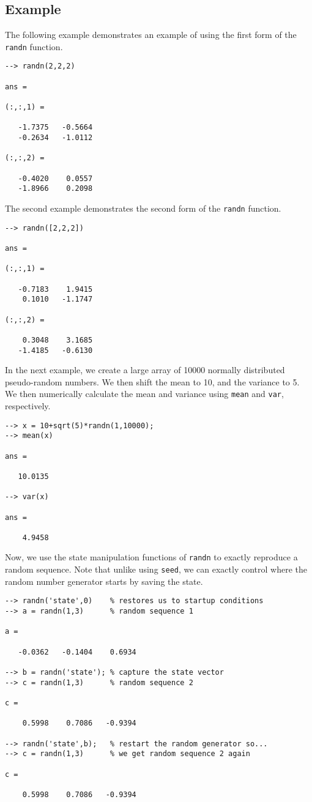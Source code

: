 \subsection{Example}

The following example demonstrates an example of using the first form of the \verb|randn| function.
\begin{verbatim}
--> randn(2,2,2)

ans = 

(:,:,1) = 

   -1.7375   -0.5664 
   -0.2634   -1.0112 

(:,:,2) = 

   -0.4020    0.0557 
   -1.8966    0.2098 
\end{verbatim}
The second example demonstrates the second form of the \verb|randn| function.
\begin{verbatim}
--> randn([2,2,2])

ans = 

(:,:,1) = 

   -0.7183    1.9415 
    0.1010   -1.1747 

(:,:,2) = 

    0.3048    3.1685 
   -1.4185   -0.6130 
\end{verbatim}
In the next example, we create a large array of 10000  normally distributed pseudo-random numbers.  We then shift the mean to 10, and the variance to 5.  We then numerically calculate the mean and variance using \verb|mean| and \verb|var|, respectively.
\begin{verbatim}
--> x = 10+sqrt(5)*randn(1,10000);
--> mean(x)

ans = 

   10.0135 

--> var(x)

ans = 

    4.9458 
\end{verbatim}
Now, we use the state manipulation functions of \verb|randn| to exactly reproduce 
a random sequence.  Note that unlike using \verb|seed|, we can exactly control where
the random number generator starts by saving the state.
\begin{verbatim}
--> randn('state',0)    % restores us to startup conditions
--> a = randn(1,3)      % random sequence 1

a = 

   -0.0362   -0.1404    0.6934 

--> b = randn('state'); % capture the state vector
--> c = randn(1,3)      % random sequence 2  

c = 

    0.5998    0.7086   -0.9394 

--> randn('state',b);   % restart the random generator so...
--> c = randn(1,3)      % we get random sequence 2 again

c = 

    0.5998    0.7086   -0.9394 
\end{verbatim}
